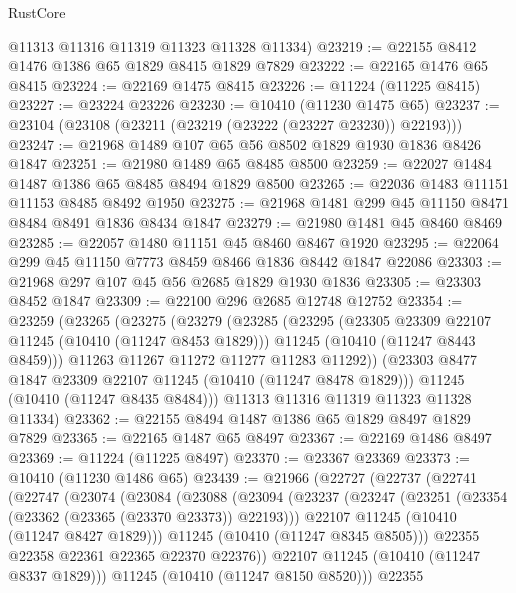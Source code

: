 \begin{lexlean}{RustCore}
\begin{coremodule}
      @11313
      @11316
      @11319
      @11323
      @11328
      @11334)
@23219 := @22155 @8412 @1476 @1386 @65 @1829 @8415 @1829 @7829
@23222 := @22165 @1476 @65 @8415
@23224 := @22169 @1475 @8415
@23226 := @11224 (@11225 @8415)
@23227 := @23224 @23226
@23230 := @10410 (@11230 @1475 @65)
@23237 := @23104 (@23108 (@23211 (@23219 (@23222 (@23227 @23230)) @22193)))
@23247 := @21968 @1489 @107 @65 @56 @8502 @1829 @1930 @1836 @8426 @1847
@23251 := @21980 @1489 @65 @8485 @8500
@23259 := @22027 @1484 @1487 @1386 @65 @8485 @8494 @1829 @8500
@23265 := @22036 @1483 @11151 @11153 @8485 @8492 @1950
@23275 := @21968 @1481 @299 @45 @11150 @8471 @8484 @8491 @1836 @8434 @1847
@23279 := @21980 @1481 @45 @8460 @8469
@23285 := @22057 @1480 @11151 @45 @8460 @8467 @1920
@23295 := @22064 @299 @45 @11150 @7773 @8459 @8466 @1836 @8442 @1847 @22086
@23303 := @21968 @297 @107 @45 @56 @2685 @1829 @1930 @1836
@23305 := @23303 @8452 @1847
@23309 := @22100 @296 @2685 @12748 @12752
@23354 := @23259
    (@23265
      (@23275
        (@23279
          (@23285
            (@23295
              (@23305 @23309 @22107 @11245 (@10410 (@11247 @8453 @1829)))
              @11245
              (@10410 (@11247 @8443 @8459)))
            @11263
            @11267
            @11272
            @11277
            @11283
            @11292))
        (@23303 @8477 @1847 @23309 @22107 @11245 (@10410 (@11247 @8478 @1829)))
        @11245
        (@10410 (@11247 @8435 @8484)))
      @11313
      @11316
      @11319
      @11323
      @11328
      @11334)
@23362 := @22155 @8494 @1487 @1386 @65 @1829 @8497 @1829 @7829
@23365 := @22165 @1487 @65 @8497
@23367 := @22169 @1486 @8497
@23369 := @11224 (@11225 @8497)
@23370 := @23367 @23369
@23373 := @10410 (@11230 @1486 @65)
@23439 := @21966
    (@22727
      (@22737
        (@22741
          (@22747
            (@23074
              (@23084
                (@23088
                  (@23094
                    (@23237
                      (@23247
                        (@23251 (@23354 (@23362 (@23365 (@23370 @23373)) @22193)))
                        @22107
                        @11245
                        (@10410 (@11247 @8427 @1829)))
                      @11245
                      (@10410 (@11247 @8345 @8505)))
                    @22355
                    @22358
                    @22361
                    @22365
                    @22370
                    @22376))
                @22107
                @11245
                (@10410 (@11247 @8337 @1829)))
              @11245
              (@10410 (@11247 @8150 @8520)))
            @22355

\end{coremodule}
\end{lexlean}
